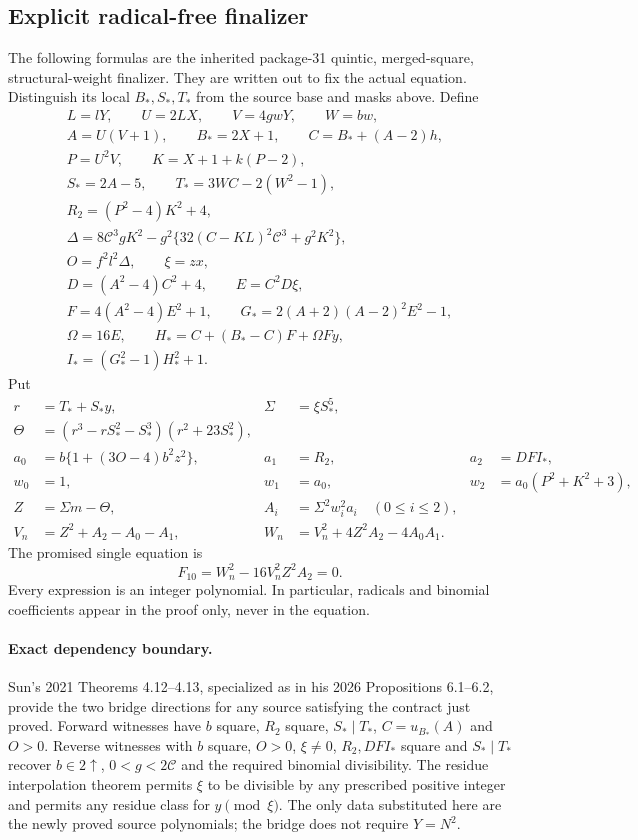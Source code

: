 \subsection{Explicit radical-free finalizer}

The following formulas are the inherited package-31 quintic,
merged-square, structural-weight finalizer. They are written out to fix
the actual equation. Distinguish its local $B_*,S_*,T_*$ from the source
base and masks above. Define
\begin{gather*}
 L=lY,\qquad U=2LX,\qquad V=4gwY,\qquad W=bw,\\
 A=U(V+1),\qquad B_*=2X+1,\qquad C=B_*+(A-2)h,\\
 P=U^2V,\qquad K=X+1+k(P-2),\\
 S_*=2A-5,\qquad T_*=3WC-2(W^2-1),\\
 R_2=(P^2-4)K^2+4,\\
 \Delta=8\mathcal C^3gK^2-g^2\{32(C-KL)^2\mathcal C^3+g^2K^2\},\\
 O=f^2l^2\Delta,\qquad \xi=zx,\\
 D=(A^2-4)C^2+4,\qquad E=C^2D\xi,\\
 F=4(A^2-4)E^2+1,\qquad G_*=2(A+2)(A-2)^2E^2-1,\\
 \Omega=16E,\qquad H_*=C+(B_*-C)F+\Omega Fy,\\
 I_*=(G_*^2-1)H_*^2+1.
\end{gather*}
Put
\begin{align*}
 r&=T_*+S_*y,&\Sigma&=\xi S_*^5,\\
 \Theta&=(r^3-rS_*^2-S_*^3)(r^2+23S_*^2),\\
 a_0&=b\{1+(3O-4)b^2z^2\},&a_1&=R_2,&a_2&=DFI_*,\\
 w_0&=1,&w_1&=a_0,&w_2&=a_0(P^2+K^2+3),\\
 Z&=\Sigma m-\Theta,&A_i&=\Sigma^2w_i^2a_i\quad(0\le i\le2),\\
 V_n&=Z^2+A_2-A_0-A_1,&W_n&=V_n^2+4Z^2A_2-4A_0A_1.
\end{align*}
The promised single equation is
\begin{equation}\label{eq:sel-final-ten}
 \boxed{\ F_{10}=W_n^2-16V_n^2Z^2A_2=0.\ }
\end{equation}
Every expression is an integer polynomial. In particular, radicals and
binomial coefficients appear in the proof only, never in the equation.

\paragraph{Exact dependency boundary.}
Sun's 2021 Theorems 4.12--4.13, specialized as in his 2026 Propositions
6.1--6.2, provide the two bridge directions for any source satisfying the
contract just proved. Forward witnesses have $b$ square, $R_2$ square,
$S_*\mid T_*$, $C=u_{B_*}(A)$ and $O>0$. Reverse witnesses with
$b$ square, $O>0$, $\xi\ne0$, $R_2,DFI_*$ square and $S_*\mid T_*$
recover $b\in2\uparrow$, $0<g<2\mathcal C$ and the required binomial
divisibility. The residue interpolation theorem permits $\xi$ to be
divisible by any prescribed positive integer and permits any residue
class for $y\pmod\xi$.
The only data substituted here are the newly proved source polynomials;
the bridge does not require $Y=N^2$.


